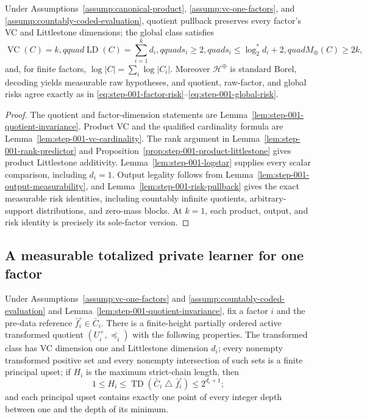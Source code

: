 \begin{proposition}
\label{prop:step-001-structural-certificate}
Under Assumptions~\ref{assump:canonical-product},
\ref{assump:vc-one-factors}, and
\ref{assump:countably-coded-evaluation}, quotient pullback preserves every
factor's VC and Littlestone dimensions; the global class satisfies
\[
\operatorname{VC}(C)=k,qquad
\operatorname{LD}(C)=\sum_{i=1}^k d_i,qquad
s_i\ge2,quad s_i\le\log_2^*d_i+2,quad M_{\oplus}(C)\ge2k,
\]
and, for finite factors, \(\log|C|=\sum_i\log|C_i|\).  Moreover
\(\mathcal H^{\oplus}\) is standard Borel, decoding yields measurable raw
hypotheses, and quotient, raw-factor, and global risks agree exactly as in
\eqref{eq:step-001-factor-risk}--\eqref{eq:step-001-global-risk}.
\end{proposition}

\begin{proof}
The quotient and factor-dimension statements are
Lemma~\ref{lem:step-001-quotient-invariance}.  Product VC and the qualified
cardinality formula are Lemma~\ref{lem:step-001-vc-cardinality}.  The rank
argument in Lemma~\ref{lem:step-001-rank-predictor} and
Proposition~\ref{prop:step-001-product-littlestone} gives product
Littlestone additivity.  Lemma~\ref{lem:step-001-logstar} supplies every
scalar comparison, including \(d_i=1\).  Output legality follows from
Lemma~\ref{lem:step-001-output-measurability}, and
Lemma~\ref{lem:step-001-risk-pullback} gives the exact measurable risk
identities, including countably infinite quotients, arbitrary-support
distributions, and zero-mass blocks.  At \(k=1\), each product, output, and
risk identity is precisely its sole-factor version.
\end{proof}

\subsection{A measurable totalized private learner for one factor}
\label{app:step-002}

\begin{lemma}
\label{lem:step-002-order-geometry}
Under Assumptions~\ref{assump:vc-one-factors} and
\ref{assump:countably-coded-evaluation} and
Lemma~\ref{lem:step-001-quotient-invariance}, fix a factor \(i\) and the
pre-data reference \(\bar f_i^\circ\in\bar C_i\).  There is a finite-height
partially ordered active transformed quotient \((U_i^+,\preceq_i)\) with
the following properties.  The transformed class has VC dimension one and
Littlestone dimension \(d_i\); every nonempty transformed positive set and
every nonempty intersection of such sets is a finite principal upset; if
\(H_i\) is the maximum strict-chain length, then
\begin{equation}\label{eq:step-002-height}
1\le H_i\le \operatorname{TD}(\bar C_i\mathbin\triangle\bar f_i^\circ)
\le2^{d_i+1};
\end{equation}
and each principal upset contains exactly one point of every integer depth
between one and the depth of its minimum.
\end{lemma}

